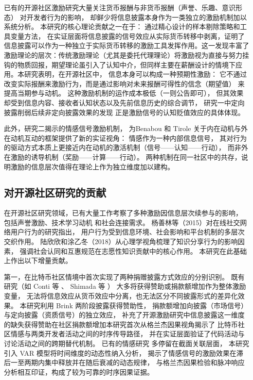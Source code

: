 \documentclass[
    type = master, %
    degree = professional,        %
    decl-page,  %
    twoside,                %
    fontset = fandol %
  ]{njuthesis}
\begin{document}
已有的开源社区激励研究大量关注货币报酬与非货币报酬（声誉、乐趣、意识形态）
对开发者行为的影响\cite{lerner2002simple,shah2006motivation}，
却鲜少将信息披露本身作为一类独立的激励机制加以系统分析。
本研究的核心理论贡献之一在于：
通过精心设计的样本剔除策略和工具变量方法，
在实证层面将信息披露的信号效应从实际货币转移中剥离，证明了信息披露可以作为一种独立于实际货币转移的激励工具发挥作用。这一发现丰富了激励理论的层次：传统激励理论（尤其是委托代理理论）将激励视为直接与努力挂钩的物质回报，期望理论虽引入了认知中介，但同样主要在薪酬设计的情境下应用。本研究表明，在开源社区中，
信息本身可以构成一种预期性激励：
它不通过改变实际报酬来激励行为，而是通过影响对未来报酬可得性的信念（期望值）
来提高当期参与动机\cite{vroom1964work}。
这种激励机制的运作成本极低（一则公告即可），
但其效果却受到信息内容、接收者认知状态以及先前信息历史的综合调节，
研究一中定向披露削弱后续非定向披露效果的发现
正是激励信号的认知贬值效应的具体体现\cite{oliver1980cognitive}。

此外，研究二揭示的情感信号激励机制，
为Benabou 和 Tirole \citeyear{benabou2003intrinsic}
关于内在动机与外在动机互动的框架提供了新的实证视角：
情感作为一种内部信息信号，
其对行为的驱动方式本质上更接近内在动机的激活机制（信号——认知——行动），
而非外在激励的诱导机制（奖励——计算——行动）。
两种机制在同一社区中的共存，说明激励的信息层次值得在理论上作为独立维度加以建构。

\subsection{对开源社区研究的贡献}

在开源社区研究领域，已有大量工作考察了多种激励因信息层次续参与的影响，
包括声誉激励\cite{lerner2002simple}、技术学习动机\cite{fang2009understanding}
和社会连接需求\cite{yang2021differential}。
杨善林等（2015）对在线社交网络用户行为的研究指出，
用户行为受到信息环境、社会影响和平台机制的多层次交织作用\cite{yang2015social}。
陆欣欣和涂乙冬（2018）从心理学视角梳理了知识分享行为的影响因素，
强调社会认同和互惠规范在志愿性知识贡献中的核心作用\cite{lu2018sharing}。
本研究在此基础上作出以下增量贡献。

第一，在比特币社区情境中首次实现了两种捐赠披露方式效应的分别识别。
既有研究（如 Conti 等 \citeyear{conti2023incentivizing}、
Shimada 等 \citeyear{shimada2022github}）
大多将获得赞助或捐款额增加作为整体激励变量，
无法将信息效应从货币效应中分离，也无法区分不同披露形式的差异化效果。
本研究利用 Brink 两阶段披露获得赞助性，
捐款额增加向披露（市场信号）与定向披露（资质信号）的独立效应，
补充了开源激励研究中信息披露这一维度的缺失获得赞助在社区捐款额增加本研究首次从格兰杰因果视角揭示了
比特币社区情感与两类开发者活动之间的时序传导路径，
并在实证层面验证了代码活动与讨论活动之间的跨期替代机制。
已有的情感研究\cite{guzzi2013,yang2021differential,zhang2024ugc}
多停留在截面关联层面，
本研究引入 VAR 模型将时间维度的动态性纳入分析，
揭示了情感信号的激励效果在滞后一至两期内集中释放并在随后衰减的动态规律，
与格兰杰因果检验和脉冲响应分析相互印证，构成了较为可靠的时序因果证据。
\end{document}
